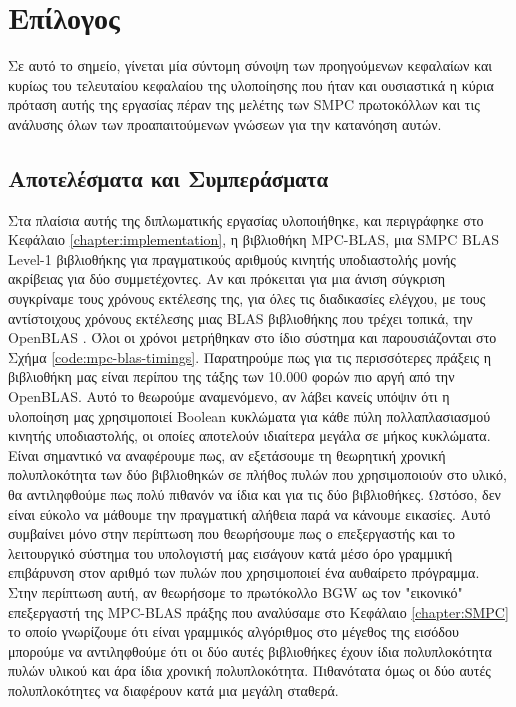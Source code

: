 \chapter{Επίλογος}
\label{chapter:postamble}

Σε αυτό το σημείο, γίνεται μία σύντομη σύνοψη των προηγούμενων κεφαλαίων και κυρίως του τελευταίου κεφαλαίου της υλοποίησης που ήταν και ουσιαστικά η κύρια πρόταση αυτής της εργασίας πέραν της μελέτης των SMPC πρωτοκόλλων και τις ανάλυσης όλων των προαπαιτούμενων γνώσεων για την κατανόηση αυτών.

\section{Αποτελέσματα και Συμπεράσματα}

Στα πλαίσια αυτής της διπλωματικής εργασίας υλοποιήθηκε, και περιγράφηκε στο Κεφάλαιο \ref{chapter:implementation}, η βιβλιοθήκη MPC-BLAS, μια SMPC BLAS Level-1 βιβλιοθήκης
για πραγματικούς αριθμούς κινητής υποδιαστολής μονής ακρίβειας για δύο συμμετέχοντες. Αν και πρόκειται για μια άνιση σύγκριση συγκρίναμε τους χρόνους εκτέλεσης της, για όλες τις διαδικασίες ελέγχου, με τους αντίστοιχους χρόνους εκτέλεσης μιας BLAS βιβλιοθήκης που τρέχει τοπικά, την OpenBLAS \cite{xian2011openblas}. Όλοι οι χρόνοι μετρήθηκαν στο ίδιο σύστημα και παρουσιάζονται στο Σχήμα \ref{code:mpc-blas-timings}. Παρατηρούμε πως για τις περισσότερες πράξεις η βιβλιοθήκη μας είναι περίπου της τάξης των 10.000 φορών πιο αργή από την OpenBLAS. Αυτό το θεωρούμε αναμενόμενο, αν λάβει κανείς υπόψιν ότι η υλοποίηση μας χρησιμοποιεί Boolean κυκλώματα για κάθε πύλη πολλαπλασιασμού κινητής υποδιαστολής, οι οποίες αποτελούν ιδιαίτερα μεγάλα σε μήκος κυκλώματα. Είναι σημαντικό να αναφέρουμε πως, αν εξετάσουμε τη θεωρητική χρονική πολυπλοκότητα των δύο βιβλιοθηκών σε πλήθος πυλών που χρησιμοποιούν στο υλικό, θα αντιληφθούμε πως πολύ πιθανόν να ίδια και για τις δύο βιβλιοθήκες. Ωστόσο, δεν είναι εύκολο να μάθουμε την πραγματική αλήθεια παρά να κάνουμε εικασίες. Αυτό συμβαίνει μόνο στην περίπτωση που θεωρήσουμε πως ο επεξεργαστής και το λειτουργικό σύστημα του υπολογιστή μας εισάγουν κατά μέσο όρο γραμμική επιβάρυνση στον αριθμό των πυλών που χρησιμοποιεί ένα αυθαίρετο πρόγραμμα. Στην περίπτωση αυτή, αν θεωρήσομε το πρωτόκολλο BGW ως τον "εικονικό" επεξεργαστή της MPC-BLAS πράξης που αναλύσαμε στο Κεφάλαιο \ref{chapter:SMPC} το οποίο γνωρίζουμε ότι είναι γραμμικός αλγόριθμος στο μέγεθος της εισόδου μπορούμε να αντιληφθούμε ότι οι δύο αυτές βιβλιοθήκες έχουν ίδια πολυπλοκότητα πυλών υλικού και άρα ίδια χρονική πολυπλοκότητα. Πιθανότατα όμως οι δύο αυτές πολυπλοκότητες να διαφέρουν κατά μια μεγάλη σταθερά.

